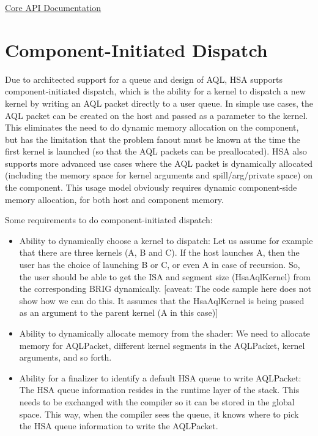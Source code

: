 \documentclass[draft]{book}
\begin{document}
\begin{appendices}
\hyperlink{coreapi}{Core API
Documentation}\hypertarget{dtde}{}\section{Component-\/\-Initiated
Dispatch}\label{dtde}

Due to architected support for a queue and design of AQL, HSA supports
component-\/initiated dispatch, which is the ability for a kernel to dispatch a
new kernel by writing an AQL packet directly to a user queue. In simple use
cases, the AQL packet can be created on the host and passed as a parameter to
the kernel. This eliminates the need to do dynamic memory allocation on the
component, but has the limitation that the problem fanout must be known at the
time the first kernel is launched (so that the AQL packets can be
preallocated). HSA also supports more advanced use cases where the AQL packet is
dynamically allocated (including the memory space for kernel arguments and
spill/arg/private space) on the component. This usage model obviously requires
dynamic component-\/side memory allocation, for both host and component memory.

Some requirements to do component-\/initiated dispatch:
\begin{itemize}
\item Ability to dynamically choose a kernel to dispatch: Let us assume for
  example that there are three kernels (A, B and C). If the host launches A,
  then the user has the choice of launching B or C, or even A in case of
  recursion. So, the user should be able to get the ISA and segment size
  (Hsa\-Aql\-Kernel) from the corresponding BRIG dynamically. \mbox{[}caveat:
  The code sample here does not show how we can do this. It assumes that the
  Hsa\-Aql\-Kernel is being passed as an argument to the parent kernel (A in
  this case)\mbox{]}

\item Ability to dynamically allocate memory from the shader: We need to
  allocate memory for AQL\-Packet, different kernel segments in the AQL\-Packet,
  kernel arguments, and so forth.

\item Ability for a finalizer to identify a default HSA queue to write
  AQL\-Packet: The HSA queue information resides in the runtime layer of the
  stack. This needs to be exchanged with the compiler so it can be stored in the
  global space. This way, when the compiler sees the queue, it knows where to
  pick the HSA queue information to write the AQL\-Packet.


\end{itemize}
\end{appendices}
\end{document}
